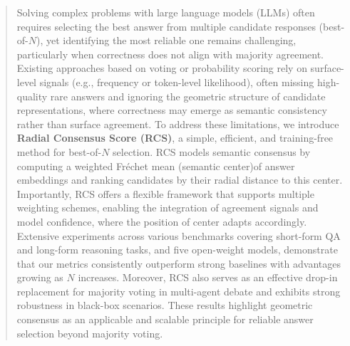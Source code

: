 \begin{abstract}

Solving complex problems with large language models (LLMs) often requires selecting the best answer from multiple candidate responses (best-of-$N$), yet identifying the most reliable one remains challenging, particularly when correctness does not align with majority agreement.
Existing approaches based on voting or probability scoring rely on surface-level signals (e.g., frequency or token-level likelihood), often missing high-quality rare answers and ignoring the geometric structure of candidate representations, where correctness may emerge as semantic consistency rather than surface agreement.
To address these limitations, we introduce \textbf{Radial Consensus Score (RCS)}, a simple, efficient, and training-free method for best-of-$N$ selection. 
RCS models semantic consensus by computing a weighted Fréchet mean (semantic center)of answer embeddings and ranking candidates by their radial distance to this center. Importantly, RCS offers a flexible framework that supports multiple weighting schemes, enabling the integration of agreement signals and model confidence, where the position of center adapts accordingly.
Extensive experiments across various benchmarks covering short-form QA and long-form reasoning tasks, and five open-weight models, demonstrate that our metrics consistently outperform strong baselines with advantages growing as $N$ increases.
Moreover, RCS also serves as an effective drop-in replacement for majority voting in multi-agent debate and exhibits strong robustness in black-box scenarios.
These results highlight geometric consensus as an applicable and scalable principle for reliable answer selection beyond majority voting.
\end{abstract}